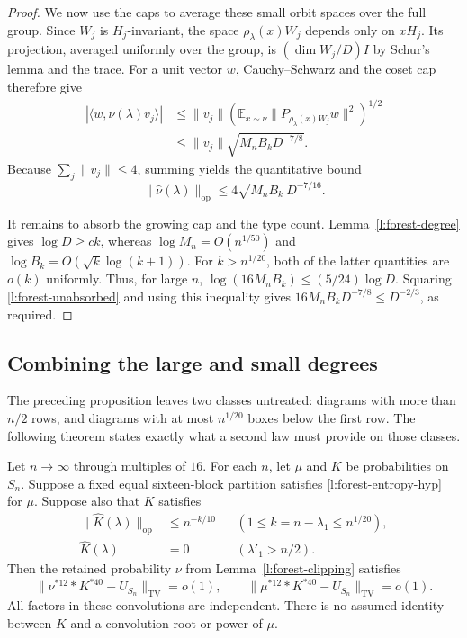 \begin{proof}
We now use the caps to average these small orbit spaces over the full
group.  Since $W_j$ is $H_j$-invariant, the space
$\rho_\lambda(x)W_j$ depends only on $xH_j$.
Its projection, averaged uniformly over the group, is
$(\dim W_j/D)I$ by Schur's lemma and the trace.
For a unit vector $w$, Cauchy--Schwarz and the coset cap therefore give
\[
 \begin{split}
 |\langle w,\widehat\nu(\lambda)v_j\rangle|
 &\le\|v_j\|
 \left(\mathbb E_{x\sim\nu}
       \|P_{\rho_\lambda(x)W_j}w\|^2\right)^{1/2}\\
 &\le\|v_j\|\sqrt{M_n B_kD^{-7/8}}.
 \end{split}
\]
Because $\sum_j\|v_j\|\le4$, summing yields the quantitative bound
\begin{equation}
 \|\widehat\nu(\lambda)\|_{\mathrm{op}}
 \le4\sqrt{M_n B_k}\,D^{-7/16}.
 \label{l:forest-unabsorbed}
\end{equation}

It remains to absorb the growing cap and the type count.
Lemma~\ref{l:forest-degree} gives $\log D\ge ck$, whereas
$\log M_n=O(n^{1/50})$ and
$\log B_k=O(\sqrt k\log(k+1))$.
For $k>n^{1/20}$, both of the latter quantities are $o(k)$
uniformly.  Thus, for large $n$,
$\log(16M_nB_k)\le(5/24)\log D$.
Squaring \eqref{l:forest-unabsorbed} and using this inequality gives
$16M_nB_kD^{-7/8}\le D^{-2/3}$, as required.
\end{proof}

\subsection{Combining the large and small degrees}

The preceding proposition leaves two classes untreated: diagrams with
more than $n/2$ rows, and diagrams with at most $n^{1/20}$ boxes below
the first row.  The following theorem states exactly what a second law
must provide on those classes.

\begin{theorem}
\label{l:forest-hybrid}
Let $n\to\infty$ through multiples of $16$.
For each $n$, let $\mu$ and $K$ be probabilities on $S_n$.
Suppose a fixed equal sixteen-block partition satisfies
\eqref{l:forest-entropy-hyp} for $\mu$.  Suppose also that $K$ satisfies
\begin{align}
 \|\widehat K(\lambda)\|_{\mathrm{op}}
 &\le n^{-k/10}
 &&\left(1\le k=n-\lambda_1\le n^{1/20}\right),
 \label{l:forest-sparse-hyp}\\
 \widehat K(\lambda)&=0
 &&\left(\lambda'_1>n/2\right).
 \label{l:forest-row-hyp}
\end{align}
Then the retained probability $\nu$ from
Lemma~\ref{l:forest-clipping} satisfies
\begin{equation}
 \|\nu^{*12}*K^{*40}-U_{S_n}\|_{\mathrm{TV}}=o(1),
 \qquad
 \|\mu^{*12}*K^{*40}-U_{S_n}\|_{\mathrm{TV}}=o(1).
 \label{l:forest-hybrid-conclusion}
\end{equation}
All factors in these convolutions are independent.  There is no assumed
identity between $K$ and a convolution root or power of $\mu$.
\end{theorem}

